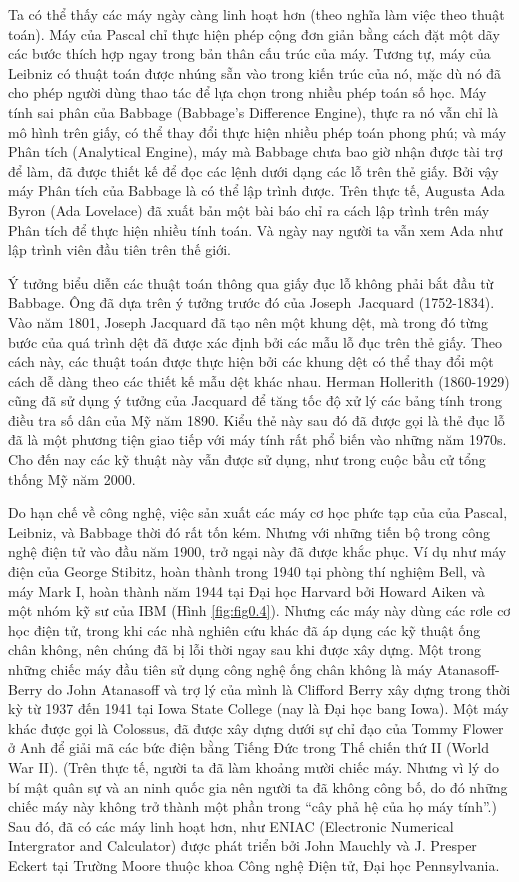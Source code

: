 Ta có thể thấy các máy ngày càng linh hoạt hơn (theo nghĩa làm việc theo thuật toán). Máy
của Pascal chỉ thực hiện phép cộng đơn giản bằng cách đặt một dãy các bước thích hợp ngay
trong bản thân cấu trúc của máy. Tương tự, máy của Leibniz có thuật toán được nhúng sẵn
vào trong kiến trúc của nó, mặc dù nó đã cho phép người dùng thao tác để lựa chọn trong
nhiều phép toán số học. Máy tính sai phân của Babbage (Babbage's Difference Engine), thực
ra nó vẫn chỉ là mô hình trên giấy, có thể thay đổi thực hiện nhiều phép toán phong phú;
và máy Phân tích (Analytical Engine), máy mà Babbage chưa bao giờ nhận được tài trợ để
làm, đã được thiết kế để đọc các lệnh dưới dạng các lỗ trên thẻ giấy. Bởi vậy máy Phân
tích của Babbage là có thể lập trình được. Trên thực tế, Augusta Ada Byron (Ada Lovelace)
đã xuất bản một bài báo chỉ ra cách lập trình trên máy Phân tích để thực hiện nhiều tính
toán. Và ngày nay người ta vẫn xem Ada như lập trình viên đầu tiên trên thế giới.


Ý tưởng biểu diễn các thuật toán thông qua giấy đục lỗ không phải bắt đầu từ Babbage. Ông
đã dựa trên ý tưởng trước đó của Joseph~Jacquard (1752-1834). Vào năm 1801,
Joseph Jacquard đã tạo nên một khung dệt, mà trong đó từng bước của quá trình dệt đã được
xác định bởi các mẫu lỗ đục trên thẻ giấy. Theo cách này, các thuật toán được thực hiện
bởi các khung dệt có thể thay đổi một cách dễ dàng theo các thiết kế mẫu dệt khác
nhau. Herman Hollerith (1860-1929) cũng đã sử dụng ý tưởng của Jacquard để tăng tốc độ xử
lý các bảng tính trong điều tra số dân của Mỹ năm 1890. Kiểu thẻ này sau đó đã được gọi là
thẻ đục lỗ đã là một phương tiện giao tiếp với máy tính rất phổ biến vào những năm
1970s. Cho đến nay các kỹ thuật này vẫn được sử dụng, như trong cuộc bầu cử tổng thống Mỹ
năm 2000.

Do hạn chế về công nghệ, việc sản xuất các máy cơ học phức tạp của của Pascal, Leibniz, và
Babbage thời đó rất tốn kém. Nhưng với những tiến bộ trong công nghệ điện tử vào đầu năm
1900, trở ngại này đã được khắc phục. Ví dụ như máy điện của George Stibitz, hoàn thành
trong 1940 tại phòng thí nghiệm Bell, và máy Mark I, hoàn thành năm 1944 tại Đại học
Harvard bởi Howard Aiken và một nhóm kỹ sư của IBM (Hình \ref{fig:fig0.4}). Nhưng các máy
này dùng các rơle cơ học điện tử, trong khi các nhà nghiên cứu khác đã áp dụng các kỹ
thuật ống chân không, nên chúng đã bị lỗi thời ngay sau khi được xây dựng. Một trong những
chiếc máy đầu tiên sử dụng công nghệ ống chân không là máy Atanasoff-Berry do John
Atanasoff và trợ lý của mình là Clifford Berry xây dựng trong thời kỳ từ 1937 đến 1941 tại
Iowa State College (nay là Đại học bang Iowa). Một máy khác được gọi là Colossus, đã được
xây dựng dưới sự chỉ đạo của Tommy Flower ở Anh để giải mã các bức điện bằng Tiếng Đức
trong Thế chiến thứ II (World War II). (Trên thực tế, người ta đã làm khoảng mười chiếc
máy. Nhưng vì lý do bí mật quân sự và an ninh quốc gia nên người ta đã không công bố, do
đó những chiếc máy này không trở thành một phần trong ``cây phả hệ của họ máy tính''.)
Sau đó, đã có các máy linh hoạt hơn, như ENIAC (Electronic Numerical Intergrator and
Calculator) được phát triển bởi John Mauchly và J. Presper Eckert tại Trường Moore thuộc
khoa Công nghệ Điện tử, Đại học Pennsylvania.

